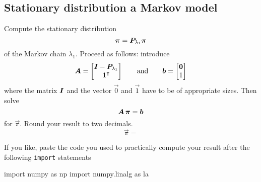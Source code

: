 
\color{black}
\subsection*{Stationary distribution a Markov model}

Compute the stationary distribution
\begin{equation*}
\bm{\pi} = \bm{P}_{\lambda_1} \bm{\pi}
\end{equation*}
of the Markov chain $\lambda_1$. Proceed as follows: introduce 
\begin{equation*}
  \bm{A} = \begin{bmatrix} \bm{I} - \bm{P}_{\lambda_1} \\ \bm{1}^\intercal \end{bmatrix} \qquad \text{and} \qquad 
  \bm{b} = \begin{bmatrix} \bm{0} \\ 1 \end{bmatrix}
\end{equation*}
where the matrix $\bm{I}$ and the vector $\vec{0}$ and $\vec{1}$ have to be of appropriate sizes. Then solve
\begin{equation*}
\bm{A} \, \bm{\pi} = \bm{b}
\end{equation*}
for $\vec{\pi}$. Round your result to two decimals.
\color{blue}
\begin{equation*}
\vec{\pi} = 
\end{equation*}
\color{black}

If you like, paste the code you used to practically compute your result after the following \texttt{import} statements
\color{blue}
\begin{PythonCode}
import numpy as np
import numpy.linalg as la


\end{PythonCode}
\color{black}


